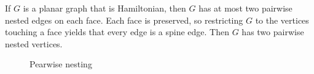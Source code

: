 If $G$ is a planar graph that is Hamiltonian, then $G$ has at most two pairwise nested edges on each face. Each face is preserved, so restricting $G$ to the vertices touching a face yields that every edge is a spine edge. Then $G$ has two pairwise nested vertices.

\begin{figure*}[h!]
    \centering
    
    \caption{Pearwise nesting}
\end{figure*}